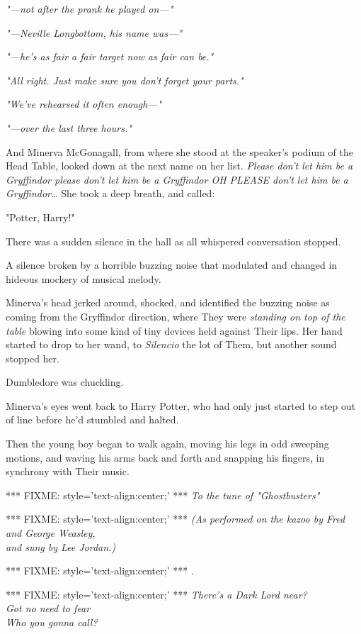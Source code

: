 \emph{"---not after the prank he played on---"}

\emph{"---Neville Longbottom, his name was---"}

\emph{"---he's as fair a fair target now as fair can be."}

\emph{"All right. Just make sure you don't forget your parts."}

\emph{"We've rehearsed it often enough---"}

\emph{"---over the last three hours."}

And Minerva McGonagall, from where she stood at the speaker's podium of the Head Table, looked down at the next name on her list. \emph{Please don't let him be a Gryffindor please don't let him be a Gryffindor OH PLEASE don't let him be a Gryffindor{\ldots}} She took a deep breath, and called:

"Potter, Harry!"

There was a sudden silence in the hall as all whispered conversation stopped.

A silence broken by a horrible buzzing noise that modulated and changed in hideous mockery of musical melody.

Minerva's head jerked around, shocked, and identified the buzzing noise as coming from the Gryffindor direction, where They were \emph{standing on top of the table} blowing into some kind of tiny devices held against Their lips. Her hand started to drop to her wand, to \emph{Silencio} the lot of Them, but another sound stopped her.

Dumbledore was chuckling.

Minerva's eyes went back to Harry Potter, who had only just started to step out of line before he'd stumbled and halted.

Then the young boy began to walk again, moving his legs in odd sweeping motions, and waving his arms back and forth and snapping his fingers, in synchrony with Their music.

*** FIXME: style='text-align:center;' ***
\emph{To the tune of "Ghostbusters"}

*** FIXME: style='text-align:center;' ***
\emph{(As performed on the kazoo by Fred and George Weasley,\\
and sung by Lee Jordan.)}

*** FIXME: style='text-align:center;' ***
\emph{.}

*** FIXME: style='text-align:center;' ***
\emph{There's a Dark Lord near?\\
Got no need to fear\\
Who you gonna call?}

